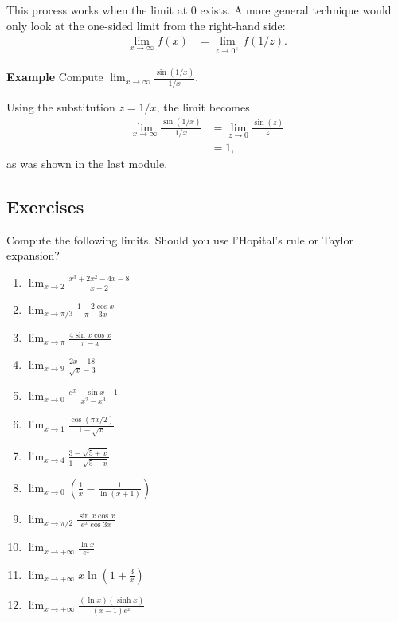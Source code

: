 \documentclass[twoside,openright,titlepage,a4paper]{book}
\begin{document}
\begin{sloppypar}
This process works when the limit at 0 exists. A more general technique would only look at the one-sided limit from the right-hand side:
\begin{align*}
\lim_{x \rightarrow \infty} f(x) &= \lim_{z \rightarrow 0^+} f(1/z).
\end{align*}

\textbf{Example} Compute $\displaystyle \lim_{x \rightarrow \infty} \frac{\sin(1/x)}{1/x}$.
\begin{examplebox}
Using the substitution $z = 1/x$, the limit becomes
\begin{align*}
\lim_{x \rightarrow \infty} \frac{\sin(1/x)}{1/x} &= \lim_{z \rightarrow 0} \frac{\sin(z)}{z} \\
&= 1,
\end{align*}
as was shown in the last module.
\end{examplebox}

\subsection{Exercises}

Compute the following limits. Should you use l'Hopital's rule or Taylor expansion?
\begin{enumerate}
\item $\displaystyle \lim_{x \to 2} \frac{x^3+2x^2-4x-8}{x-2} $
\item $\displaystyle \lim_{x \to \pi/3} \frac{1-2\cos x}{\pi -3x}$
\item $\displaystyle \lim_{x \to \pi} \frac{4 \sin x \cos x}{\pi - x}$
\item $\displaystyle \lim_{x \to 9} \frac{2x-18}{\sqrt{x}-3}$
\item $\displaystyle \lim_{x \to 0} \frac{e^x - \sin x -1}{x^2-x^3}$
\item $\displaystyle \lim_{x \to 1} \frac{\cos (\pi x/2)}{1 - \sqrt{x}}$
\item $\displaystyle \lim_{x \to 4} \frac{3 - \sqrt{5+x}}{1 - \sqrt{5-x}}$
\item $\displaystyle \lim_{x\rightarrow 0} \left(\frac{1}{x}-\frac{1}{\ln (x+1)}\right)$
\item $\displaystyle \lim_{x \to \pi/2} \frac{\sin x \cos x}{e^x\cos 3x}$
\item $\displaystyle \lim_{x \rightarrow +\infty} \frac {\ln x}{e^x}$
\item $\displaystyle \lim_{x \to +\infty} x \ln\left(1+ \frac{3}{x}\right)$
\item $\displaystyle \lim_{x \to +\infty} \frac{(\ln x)(\sinh x)}{(x-1)e^x}$
\end{enumerate}


\end{sloppypar}
\end{document}

